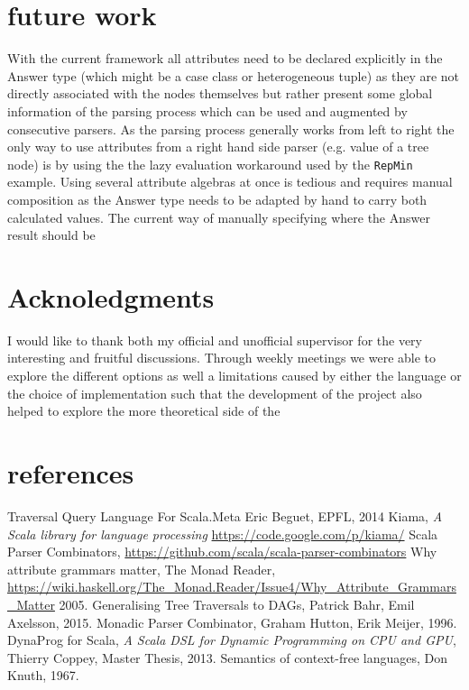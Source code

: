 \section{future work}
With the current framework all attributes need to be declared explicitly in the Answer type (which might be a case class or heterogeneous tuple) as they are not directly associated with the nodes themselves but rather present some global information of the parsing process which can be used and augmented by consecutive parsers.
As the parsing process generally works from left to right the only way to use attributes from a right hand side parser (e.g. value of a tree node) is by using the the lazy evaluation workaround used by the \verb/RepMin/ example. 
Using several attribute algebras at once is tedious and requires manual composition as the Answer type needs to be adapted by hand to carry both calculated values.
The current way of manually specifying where the Answer result should be 

\section{Acknoledgments}
I would like to thank both my official and unofficial supervisor for the very interesting and fruitful discussions. Through weekly meetings we were able to explore the different options as well a limitations caused by either the language or the choice of implementation such that the development of the project also helped to explore the more theoretical side of the 

\section{references}

\begin{thebibliography}{9}
  Traversal Query Language For Scala.Meta
  Eric Beguet, EPFL,
  2014
  Kiama,
  \emph{A Scala library for language processing}
  \url{https://code.google.com/p/kiama/}
  Scala Parser Combinators,
  \url{https://github.com/scala/scala-parser-combinators}
  Why attribute grammars matter,
  The Monad Reader,
  \url{https://wiki.haskell.org/The_Monad.Reader/Issue4/Why_Attribute_Grammars_Matter}
  2005.
  Generalising Tree Traversals to DAGs,
  Patrick Bahr, Emil Axelsson,
  2015.
  Monadic Parser Combinator,
  Graham Hutton, Erik Meijer,
  1996.
  DynaProg for Scala,
  \emph{A Scala DSL for Dynamic Programming on CPU and GPU},
  Thierry Coppey, Master Thesis,
  2013.
  Semantics of context-free languages,
  Don Knuth,
  1967.
\end{thebibliography}
